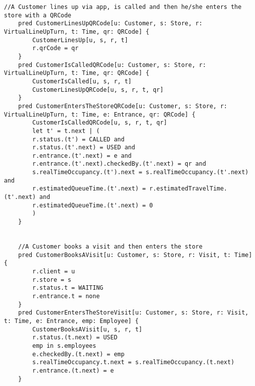 \begin{lstlisting}[language=alloy]
    //A Customer lines up via app, is called and then he/she enters the store with a QRCode
    pred CustomerLinesUpQRCode[u: Customer, s: Store, r: VirtualLineUpTurn, t: Time, qr: QRCode] {
        CustomerLinesUp[u, s, r, t]
        r.qrCode = qr
    }
    pred CustomerIsCalledQRCode[u: Customer, s: Store, r: VirtualLineUpTurn, t: Time, qr: QRCode] {
        CustomerIsCalled[u, s, r, t]
        CustomerLinesUpQRCode[u, s, r, t, qr]
    }
    pred CustomerEntersTheStoreQRCode[u: Customer, s: Store, r: VirtualLineUpTurn, t: Time, e: Entrance, qr: QRCode] {
        CustomerIsCalledQRCode[u, s, r, t, qr]
        let t' = t.next | (
        r.status.(t') = CALLED and
        r.status.(t'.next) = USED and
        r.entrance.(t'.next) = e and
        r.entrance.(t'.next).checkedBy.(t'.next) = qr and
        s.realTimeOccupancy.(t').next = s.realTimeOccupancy.(t'.next) and
        r.estimatedQueueTime.(t'.next) = r.estimatedTravelTime.(t'.next) and
        r.estimatedQueueTime.(t'.next) = 0
        )
    }


    //A Customer books a visit and then enters the store
    pred CustomerBooksAVisit[u: Customer, s: Store, r: Visit, t: Time] {
        r.client = u
        r.store = s
        r.status.t = WAITING
        r.entrance.t = none
    }
    pred CustomerEntersTheStoreVisit[u: Customer, s: Store, r: Visit, t: Time, e: Entrance, emp: Employee] {
        CustomerBooksAVisit[u, s, r, t]
        r.status.(t.next) = USED
        emp in s.employees
        e.checkedBy.(t.next) = emp
        s.realTimeOccupancy.t.next = s.realTimeOccupancy.(t.next)
        r.entrance.(t.next) = e
    }

\end{lstlisting}